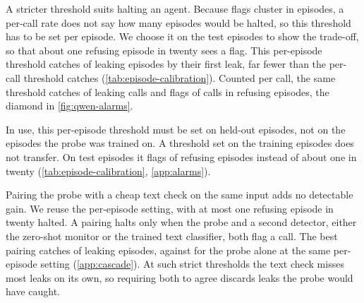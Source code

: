 A stricter threshold suits halting an agent.
Because flags cluster in episodes, a per-call rate does not say how many episodes would be halted, so this threshold has to be set per episode.
We choose it on the test episodes to show the trade-off, so that about one refusing episode in twenty sees a flag.
This per-episode threshold catches \qwenEpisodeCalCaught{} of leaking episodes by their first leak, far fewer than the per-call threshold catches (\cref{tab:episode-calibration}).
Counted per call, the same threshold catches \qwenCalibrationEpisodeLeakCallsRateRounded{} of leaking calls and flags \qwenCalibrationEpisodeRefusingCallsRate{} of calls in refusing episodes, the diamond in \cref{fig:qwen-alarms}.

In use, this per-episode threshold must be set on held-out episodes, not on the episodes the probe was trained on.
A threshold set on the training episodes does not transfer.
On test episodes it flags \qwenEpisodeCalTrainRefusingEpisodes{} of refusing episodes instead of about one in twenty (\cref{tab:episode-calibration}, \cref{app:alarms}).

Pairing the probe with a cheap text check on the same input adds no detectable gain.
We reuse the per-episode setting, with at most one refusing episode in twenty halted.
A pairing halts only when the probe and a second detector, either the zero-shot monitor or the trained text classifier, both flag a call.
The best pairing catches \cascadeBowGridFiveCaught{} of \qwenCalibrationEpisodeLeakEpisodesDenominator{} leaking episodes, against \cascadeProbeAloneFiveCaught{} for the probe alone at the same per-episode setting (\cref{app:cascade}).
At such strict thresholds the text check misses most leaks on its own, so requiring both to agree discards leaks the probe would have caught.

